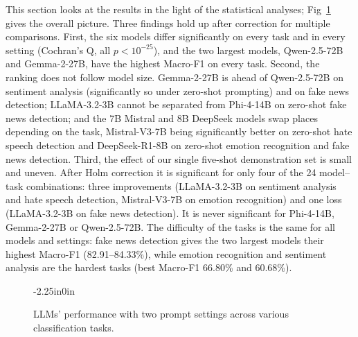 \documentclass[10pt,letterpaper]{article}
\begin{document}
This section looks at the results in the light of the statistical analyses; Fig~\ref{fig:classwise_performance} gives the overall picture. Three findings hold up after correction for multiple comparisons. First, the six models differ significantly on every task and in every setting (Cochran's Q, all $p < 10^{-25}$), and the two largest models, Qwen-2.5-72B and Gemma-2-27B, have the highest Macro-F1 on every task. Second, the ranking does not follow model size. Gemma-2-27B is ahead of Qwen-2.5-72B on sentiment analysis (significantly so under zero-shot prompting) and on fake news detection; LLaMA-3.2-3B cannot be separated from Phi-4-14B on zero-shot fake news detection; and the 7B Mistral and 8B DeepSeek models swap places depending on the task, Mistral-V3-7B being significantly better on zero-shot hate speech detection and DeepSeek-R1-8B on zero-shot emotion recognition and fake news detection. Third, the effect of our single five-shot demonstration set is small and uneven. After Holm correction it is significant for only four of the 24 model--task combinations: three improvements (LLaMA-3.2-3B on sentiment analysis and hate speech detection, Mistral-V3-7B on emotion recognition) and one loss (LLaMA-3.2-3B on fake news detection). It is never significant for Phi-4-14B, Gemma-2-27B or Qwen-2.5-72B. The difficulty of the tasks is the same for all models and settings: fake news detection gives the two largest models their highest Macro-F1 (82.91--84.33\%), while emotion recognition and sentiment analysis are the hardest tasks (best Macro-F1 66.80\% and 60.68\%).

\begin{figure}[t]
\begin{adjustwidth}{-2.25in}{0in}
    \centering
    \hfill
    \caption{LLMs' performance with two prompt settings across various classification tasks.}
    \label{fig:classwise_performance}
\end{adjustwidth}
\end{figure}
\end{document}
